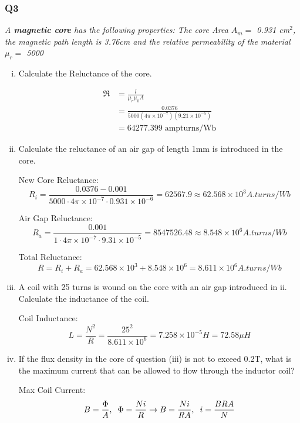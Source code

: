 \documentclass[a4paper,11pt]{article}
\begin{document}
\newpage
\subsubsection*{Q3}
\textit{A \textbf{magnetic core} has the following properties: The core Area $A_m = $ 0.931 cm$^2$, the magnetic path length is 3.76cm and the relative permeability of the material $\mu_r = $ 5000 }

\begin{enumerate}[i.]
    \item Calculate the Reluctance of the core.

          \begin{align*}
              \mathfrak{R} & = \frac{l}{\mu_{r}\mu_{0}A}                                             \\
                           & = \frac{0.0376}{5000(4\pi\times10^{-7})(9.21\times10^{-5})} \\
                           & = 64277.399 \; \mathrm{ampturns/Wb}
          \end{align*}

    \item Calculate the reluctance of an air gap of length 1mm is introduced in the core.

          New Core Reluctance:
          $$R_i = \frac{0.0376 - 0.001}{5000\cdot 4\pi\times10^{-7}\cdot 0.931\times 10^{-6}} = 62567.9 \approx 62.568\times 10^3 A.turns/Wb$$

          Air Gap Reluctance:
          $$R_a = \frac{0.001}{1\cdot 4\pi\times10^{-7}\cdot 9.31\times 10^{-5}} = 8547526.48 \approx 8.548\times 10^6 A.turns/Wb$$

          Total Reluctance:
          $$R = R_i + R_a = 62.568\times 10^3 + 8.548\times 10^6 = 8.611\times 10^6 A.turns/Wb$$

    \item A coil with 25 turns is wound on the core with an air gap introduced in ii. Calculate the inductance of the coil.

          Coil Inductance:
          $$L = \frac{N^2}{R} = \frac{25^2}{8.611\times 10^6} = 7.258\times 10^{-5}H = 72.58\mu H$$

    \item If the flux density in the core of question (iii) is not to exceed 0.2T, what is the maximum current that can be allowed to flow through the inductor coil?


          Max Coil Current:
          $$B = \frac{\Phi}{A}, \hspace{2mm} \Phi = \frac{Ni}{R} \rightarrow B = \frac{Ni}{RA}, \hspace{2mm}i = \frac{BRA}{N}$$


\end{enumerate}
\end{document}
